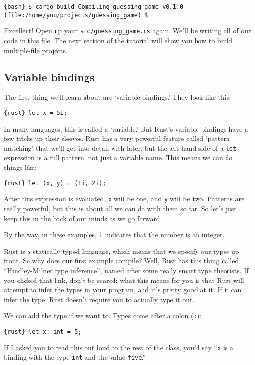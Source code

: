 \documentclass[]{article}
\begin{document}
\texttt{\{bash\} \$ cargo build    Compiling guessing\_game v0.1.0 (file:/home/you/projects/guessing\_game) \$}

Excellent! Open up your \texttt{src/guessing\_game.rs} again. We'll be
writing all of our code in this file. The next section of the tutorial
will show you how to build multiple-file projects.

\subsection{Variable bindings}\label{variable-bindings}

The first thing we'll learn about are `variable bindings.' They look
like this:

\texttt{\{rust\} let x = 5i;}

In many languages, this is called a `variable.' But Rust's variable
bindings have a few tricks up their sleeves. Rust has a very powerful
feature called `pattern matching' that we'll get into detail with later,
but the left hand side of a \texttt{let} expression is a full pattern,
not just a variable name. This means we can do things like:

\texttt{\{rust\} let (x, y) = (1i, 2i);}

After this expression is evaluated, \texttt{x} will be one, and
\texttt{y} will be two. Patterns are really powerful, but this is about
all we can do with them so far. So let's just keep this in the back of
our minds as we go forward.

By the way, in these examples, \texttt{i} indicates that the number is
an integer.

Rust is a statically typed language, which means that we specify our
types up front. So why does our first example compile? Well, Rust has
this thing called
``\href{http://en.wikipedia.org/wiki/Hindley\%E2\%80\%93Milner_type_system}{Hindley-Milner
type inference}'', named after some really smart type theorists. If you
clicked that link, don't be scared: what this means for you is that Rust
will attempt to infer the types in your program, and it's pretty good at
it. If it can infer the type, Rust doesn't require you to actually type
it out.

We can add the type if we want to. Types come after a colon
(\texttt{:}):

\texttt{\{rust\} let x: int = 5;}

If I asked you to read this out loud to the rest of the class, you'd say
``\texttt{x} is a binding with the type \texttt{int} and the value
\texttt{five}.''
\end{document}
